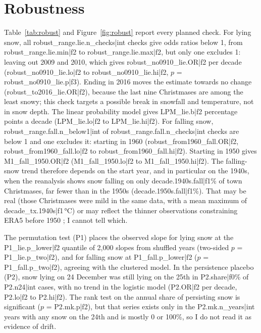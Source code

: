 \documentclass[11pt,a4paper]{article}
\begin{document}
\section{Robustness}\label{sec:robust}
Table~\ref{tab:robust} and Figure~\ref{fig:robust} report every planned check. For lying snow, all {{robust_range.lie.n_checks|int}} checks give odds ratios below 1, from {{robust_range.lie.min|f2}} to {{robust_range.lie.max|f2}}, but only one excludes 1: leaving out 2009 and 2010, which gives {{robust_no0910_lie.OR|f2}} per decade ({{robust_no0910_lie.lo|f2}} to {{robust_no0910_lie.hi|f2}}, $p$ = {{robust_no0910_lie.p|f3}}). Ending in 2016 moves the estimate towards no change ({{robust_to2016_lie.OR|f2}}), because the last nine Christmases are among the least snowy; this check targets a possible break in snowfall and temperature, not in snow depth. The linear probability model gives {{LPM_lie.b|f2}} percentage points a decade ({{LPM_lie.lo|f2}} to {{LPM_lie.hi|f2}}). For falling snow, {{robust_range.fall.n_below1|int}} of {{robust_range.fall.n_checks|int}} checks are below 1 and one excludes it: starting in 1960 ({{robust_from1960_fall.OR|f2}}, {{robust_from1960_fall.lo|f2}} to {{robust_from1960_fall.hi|f2}}). Starting in 1950 gives {{M1_fall_1950.OR|f2}} ({{M1_fall_1950.lo|f2}} to {{M1_fall_1950.hi|f2}}). The falling-snow trend therefore depends on the start year, and in particular on the 1940s, when the reanalysis shows snow falling on only {{decade.1940s.fall|f1}}\% of town Christmases, far fewer than in the 1950s ({{decade.1950s.fall|f1}}\%). That may be real (those Christmases were mild in the same data, with a mean maximum of {{decade_tx.1940s|f1}}\,°C) or may reflect the thinner observations constraining ERA5 before 1950 \citep{bell2021}; I cannot tell which.

The permutation test (P1) places the observed slope for lying snow at the {{P1_lie.p_lower|f2}} quantile of 2,000 slopes from shuffled years (two-sided $p$ = {{P1_lie.p_two|f2}}), and for falling snow at {{P1_fall.p_lower|f2}} ($p$ = {{P1_fall.p_two|f2}}), agreeing with the clustered model. In the persistence placebo (P2), snow lying on 24 December was still lying on the 25th in {{P2.share|f0}}\% of {{P2.n24|int}} cases, with no trend in the logistic model ({{P2.OR|f2}} per decade, {{P2.lo|f2}} to {{P2.hi|f2}}). The rank test on the annual share of persisting snow is significant ($p$ = {{P2.mk.p|f2}}), but that series exists only in the {{P2.mk.n_years|int}} years with any snow on the 24th and is mostly 0 or 100\%, so I do not read it as evidence of drift.
\end{document}
